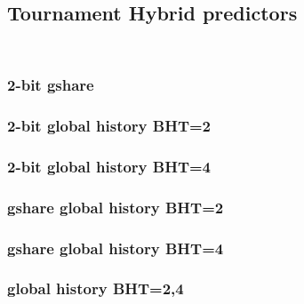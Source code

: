 \documentclass[a4paper,12pt]{article}
\begin{document}
\subsection*{Tournament Hybrid predictors}
\inputminted[linenos,fontsize=\scriptsize,frame=leftline]{cpp}{files/src-C2-hybrid_predictor.h}
\inputminted[linenos,fontsize=\scriptsize,frame=leftline]{cpp}{files/src-C2-hybrid_predictor.cpp}
\subsubsection*{2-bit gshare}
\subsubsection*{2-bit global history BHT=2}
\subsubsection*{2-bit global history BHT=4}
\subsubsection*{gshare global history BHT=2}
\subsubsection*{gshare global history BHT=4}
\subsubsection*{global history BHT=2,4}


\end{document}
